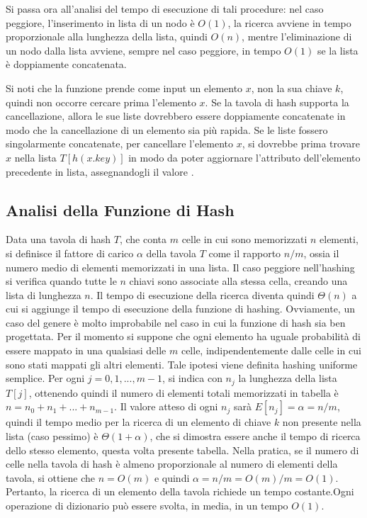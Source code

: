 Si passa ora all'analisi del tempo di esecuzione di tali procedure: nel caso peggiore, l'inserimento in lista di un nodo è \(O(1)\), la ricerca avviene in tempo proporzionale alla lunghezza della lista, quindi \(O(n)\), mentre l'eliminazione di un nodo dalla lista avviene, sempre nel caso peggiore, in tempo \(O(1)\) se la lista è doppiamente concatenata. 

Si noti che la funzione  prende come input un elemento \(x\), non la sua chiave \(k\), quindi non occorre cercare prima l'elemento \(x\). Se la tavola di hash supporta la cancellazione, allora le sue liste dovrebbero essere doppiamente concatenate in modo che la cancellazione di un elemento sia più rapida. Se le liste fossero singolarmente concatenate, per cancellare l'elemento \(x\), si dovrebbe prima trovare \(x\) nella lista \(T[h(x.key)]\) in modo da poter aggiornare l'attributo  dell'elemento precedente in lista, assegnandogli il valore .

\subsection{Analisi della Funzione di Hash}
Data una tavola di hash \(T\), che conta \(m\) celle in cui sono memorizzati \(n\) elementi, si definisce il fattore di carico \(\alpha\) della tavola \(T\) come il rapporto \(n/m\), ossia il numero medio di elementi memorizzati in una lista. Il caso peggiore nell'hashing si verifica quando tutte le \(n\) chiavi sono associate alla stessa cella, creando una lista di lunghezza \(n\). Il tempo di esecuzione della ricerca diventa quindi \(\Theta(n)\) a cui si aggiunge il tempo di esecuzione della funzione di hashing. Ovviamente, un caso del genere è molto improbabile nel caso in cui la funzione di hash sia ben progettata. Per il momento si suppone che ogni elemento ha uguale probabilità di essere mappato in una qualsiasi delle \(m\) celle, indipendentemente dalle celle in cui sono stati mappati gli altri elementi. Tale ipotesi viene definita hashing uniforme semplice. Per ogni \(j=0,1,..., m-1\), si indica con \(n_j\) la lunghezza della lista \(T[j]\), ottenendo quindi il numero di elementi totali memorizzati in tabella è \(n=n_0+n_1+...+n_{m-1}\). Il valore atteso di ogni \(n_j\) sarà \(E[n_j] = \alpha = n/m\), quindi il tempo medio per la ricerca di un elemento di chiave \(k\) non presente nella lista (caso pessimo) è \(\Theta(1+\alpha)\), che si dimostra essere anche il tempo di ricerca dello stesso elemento, questa volta presente tabella. Nella pratica, se il numero di celle nella tavola di hash è almeno proporzionale al numero di elementi della tavola, si ottiene che \(n=O(m)\) e quindi \(\alpha = n/m = O(m)/m = O(1)\). Pertanto, la ricerca di un elemento della tavola richiede un tempo costante.Ogni operazione di dizionario può essere svolta, in media, in un tempo \(O(1)\).

